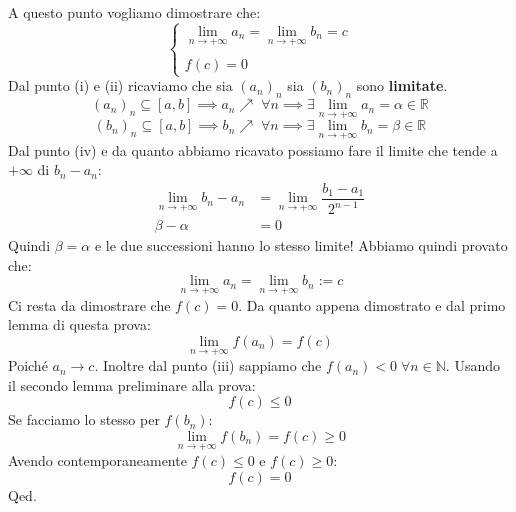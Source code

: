{  A questo punto vogliamo dimostrare che:
  \begin{equation*}
    \begin{cases*}
      \lim \limits_{n \to +\infty} a_n = \lim \limits_{n \to +\infty} b_n = c\\
      \\
      f(c) = 0
    \end{cases*}
  \end{equation*}
    Dal punto (i) e (ii) ricaviamo che sia $(a_n)_n$ sia $(b_n)_n$ sono \textbf{limitate}.
    \begin{equation*}
      (a_n)_n \subseteq [a, b] \implies a_n \nearrow \; \forall n \implies \exists \lim_{n \to +\infty} a_n = \alpha \in \mathbb{R}
    \end{equation*}
    \begin{equation*}
      (b_n)_n \subseteq [a, b] \implies b_n \nearrow \; \forall n \implies \exists \lim_{n \to +\infty} b_n = \beta \in \mathbb{R}
    \end{equation*}
    Dal punto (iv) e da quanto abbiamo ricavato possiamo fare il limite che tende a $+\infty$ di $b_n - a_n$:
    \begin{align*}
      \lim_{n \to +\infty} b_n - a_n &= \lim_{n \to +\infty} \dfrac{b_1 - a_1}{2^{n-1}}\\
      \beta - \alpha &= 0
    \end{align*}
    Quindi $\beta = \alpha$ e le due successioni hanno lo stesso limite! Abbiamo quindi provato che:
    \begin{equation*}
      \lim \limits_{n \to +\infty} a_n = \lim \limits_{n \to +\infty} b_n := c
    \end{equation*}
    Ci resta da dimostrare che $f(c) = 0$. Da quanto appena dimostrato e dal primo lemma di questa prova:
    \begin{equation*}
      \lim \limits_{n \to +\infty} f(a_n) = f(c)
    \end{equation*}
    Poiché $a_n \to c$. Inoltre dal punto (iii) sappiamo che $f(a_n) < 0 \; \forall n \in \mathbb{N}$. Usando il secondo lemma preliminare alla prova:
    \begin{equation*}
      f(c) \leq 0
    \end{equation*}
    Se facciamo lo stesso per $f(b_n)$:
    \begin{equation*}
      \lim \limits_{n \to +\infty} f(b_n) = f(c) \geq 0
    \end{equation*}
    Avendo contemporaneamente $f(c) \leq 0$ e $f(c) \geq 0$:
    \begin{equation*}
      f(c) = 0
    \end{equation*}
    \hfill Qed.
}

